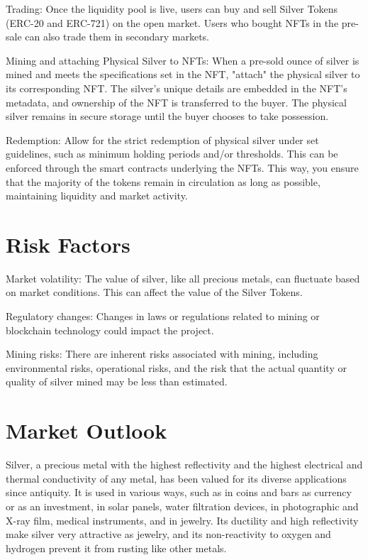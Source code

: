 \documentclass[11pt]{article}
\begin{document}
Trading: Once the liquidity pool is live, users can buy and sell Silver Tokens (ERC-20 and ERC-721) on the open market. Users who bought NFTs in the pre-sale can also trade them in secondary markets.


Mining and attaching Physical Silver to NFTs: When a pre-sold ounce of silver is mined and meets the specifications set in the NFT, "attach" the physical silver to its corresponding NFT. The silver's unique details are embedded in the NFT's metadata, and ownership of the NFT is transferred to the buyer. The physical silver remains in secure storage until the buyer chooses to take possession.


Redemption: Allow for the strict redemption of physical silver under set guidelines, such as minimum holding periods and/or thresholds. This can be enforced through the smart contracts underlying the NFTs. This way, you ensure that the majority of the tokens remain in circulation as long as possible, maintaining liquidity and market activity.


\section{Risk Factors}

Market volatility: The value of silver, like all precious metals, can fluctuate based on market conditions. This can affect the value of the Silver Tokens.


Regulatory changes: Changes in laws or regulations related to mining or blockchain technology could impact the project.


Mining risks: There are inherent risks associated with mining, including environmental risks, operational risks, and the risk that the actual quantity or quality of silver mined may be less than estimated.


\section{Market Outlook}

Silver, a precious metal with the highest reflectivity and the highest electrical and thermal conductivity of any metal, has been valued for its diverse applications since antiquity. It is used in various ways, such as in coins and bars as currency or as an investment, in solar panels, water filtration devices, in photographic and X-ray film, medical instruments, and in jewelry. Its ductility and high reflectivity make silver very attractive as jewelry, and its non-reactivity to oxygen and hydrogen prevent it from rusting like other metals.
\end{document}
